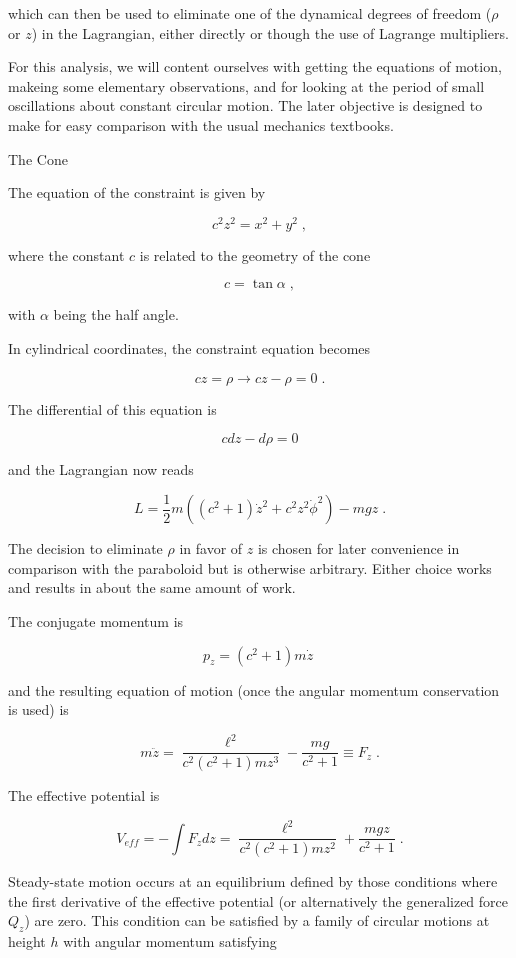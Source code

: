 \documentclass[12pt]{article}
\begin{document}
which can then be used to eliminate one of the dynamical degrees of freedom ($\rho$ or $z$) in the Lagrangian, either directly or though the use of Lagrange multipliers.

For this analysis, we will content ourselves with getting the equations of motion, makeing some elementary observations, and for looking at the period of small oscillations about constant circular motion.  The later objective is designed to make for easy comparison with the usual mechanics textbooks.

The Cone

The equation of the constraint is given by 

\[ c^2 z^2 = x^2 + y^2 \; , \]

where the constant $c$ is related to the geometry of the cone 

\[ c = \tan \alpha \; , \]

with $\alpha$ being the half angle.
 
In cylindrical coordinates, the constraint equation becomes 

\[ c z = \rho \rightarrow c z - \rho = 0 \; . \]

The differential of this equation is

\[ c dz - d \rho = 0 \]

and the Lagrangian now reads

\[ L = \frac{1}{2} m \left((c^2 + 1) \dot z^2 + c^2 z^2 \dot \phi^2 \right) - m g z \; .\]

The decision to eliminate $\rho$ in favor of $z$ is chosen for later convenience in comparison with the paraboloid but is otherwise arbitrary.  Either choice works and results in about the same amount of work.

The conjugate momentum is

\[ p_z = (c^2+1) m \dot z \; \]

and the resulting equation of motion (once the angular momentum conservation is used) is 

\[ m \ddot z = \frac{\ell^2}{c^2 (c^2+1) m z^3} - \frac{mg}{c^2+1}  \equiv F_z \; .\]

The effective potential is 

\[ V_{eff} = - \int  F_z dz = \frac{\ell^2}{c^2(c^2+1) m z^2} + \frac{mgz}{c^2+1} \; . \]

Steady-state motion occurs at an equilibrium defined by those conditions where the first derivative of the effective potential (or alternatively the generalized force $Q_z$) are zero.  This condition can be satisfied by a family of circular motions at height $h$ with angular momentum satisfying
\end{document}
